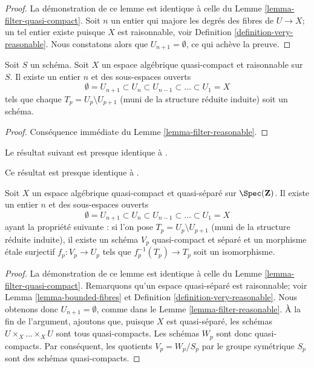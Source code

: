 \begin{proof}
La démonstration de ce lemme est identique à celle du
Lemme \ref{lemma-filter-quasi-compact}.
Soit $n$ un entier qui majore les degrés des fibres de $U \to X$;
un tel entier existe puisque $X$ est raisonnable, voir
Definition \ref{definition-very-reasonable}.
Nous constatons alors que $U_{n + 1} = \emptyset$, ce qui achève la preuve.
\end{proof}

\begin{lemma}
\label{lemma-stratify-reasonable}
Soit $S$ un schéma. Soit $X$ un espace algébrique quasi-compact et raisonnable
sur $S$. Il existe un entier $n$ et des sous-espaces ouverts
$$
\emptyset = U_{n + 1} \subset
U_n \subset U_{n - 1} \subset \ldots \subset U_1 = X
$$
tels que chaque $T_p = U_p \setminus U_{p + 1}$ (muni de la structure réduite
induite) soit un schéma.
\end{lemma}

\begin{proof}
Conséquence immédiate du Lemme \ref{lemma-filter-reasonable}.
\end{proof}

\noindent
Le résultat suivant est presque identique à
\cite[Proposition 5.7.8]{GruRay}.

\begin{lemma}
\label{lemma-filter-quasi-compact-quasi-separated}
\begin{reference}
Ce résultat est presque identique à \cite[Proposition 5.7.8]{GruRay}.
\end{reference}
Soit $X$ un espace algébrique quasi-compact et quasi-séparé sur
$\Spec(\mathbf{Z})$. Il existe un entier $n$ et des sous-espaces ouverts
$$
\emptyset = U_{n + 1} \subset
U_n \subset U_{n - 1} \subset \ldots \subset U_1 = X
$$
ayant la propriété suivante : si l'on pose $T_p = U_p \setminus U_{p + 1}$
(muni de la structure réduite induite), il existe un schéma $V_p$
quasi-compact et séparé et un morphisme étale surjectif
$f_p : V_p \to U_p$ tels que $f_p^{-1}(T_p) \to T_p$ soit un isomorphisme.
\end{lemma}

\begin{proof}
La démonstration de ce lemme est identique à celle du
Lemme \ref{lemma-filter-quasi-compact}.
Remarquons qu'un espace quasi-séparé est raisonnable; voir
Lemma \ref{lemma-bounded-fibres} et
Definition \ref{definition-very-reasonable}.
Nous obtenons donc $U_{n + 1} = \emptyset$, comme dans le
Lemme \ref{lemma-filter-reasonable}.
À la fin de l'argument, ajoutons que, puisque $X$ est quasi-séparé,
les schémas $U \times_X \ldots \times_X U$ sont tous quasi-compacts.
Les schémas $W_p$ sont donc quasi-compacts. Par conséquent, les quotients
$V_p = W_p/S_p$ par le groupe symétrique $S_p$ sont des schémas
quasi-compacts.
\end{proof}

